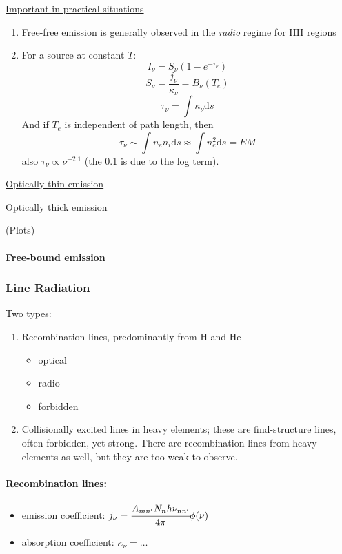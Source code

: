 \documentclass[12pt]{article}
\newcommand{\mar}[1]{\hspace{0pt}\marginpar{-\textcolor{black}{#1}-}}
\begin{document}
\mar{65}

\underline{Important in practical situations}
\begin{enumerate}
    \item Free-free emission is generally observed in the \emph{radio} regime
        for HII regions
    \item For a source at constant $T$:
        \[
            I_{\nu} = S_{\nu} \left( 1 - e^{-\tau_{\nu}} \right)
            \]
        \[
            S_{\nu} = \frac{j_{\nu}}{\kappa_{\nu}} = B_{\nu} (T_{e})
            \]
        \[
            \tau_{\nu} = \int \kappa_{\nu} \mathrm{d}s
            \]
        And if $T_{e}$ is independent of path length, then
        \[
            \tau_{\nu}
            \sim \int n_{e}n_{i} \mathrm{d}s
            \approx \int n_{e}^{2} \mathrm{d}s
            = EM
            \]
        also $\tau_{\nu} \propto \nu^{-2.1} $ (the 0.1 is due to the log term).
\end{enumerate}

\underline{Optically thin emission}

\underline{Optically thick emission}

\mar{66}(Plots)

\mar{67}

\paragraph{Free-bound emission}
\mar{68}

\subsubsection{Line Radiation}
\mar{69}Two types:
\begin{enumerate}
    \item Recombination lines, predominantly from H and He
        \begin{itemize}
            \item optical
            \item radio
            \item forbidden
        \end{itemize}
    \item Collisionally excited lines in heavy elements; these are find-structure
        lines, often forbidden, yet strong. There are recombination lines from
        heavy elements as well, but they are too weak to observe.
\end{enumerate}

\paragraph{Recombination lines:}
\begin{itemize}
    \item emission coefficient:
        $ j_{\nu} = \cfrac{A_{mn'} N_{n} h\nu_{nn'}}{4\pi} \phi(\nu) $
    \item absorption coefficient:
        $ \kappa_{\nu} = \ldots $
\end{itemize}
\end{document}
